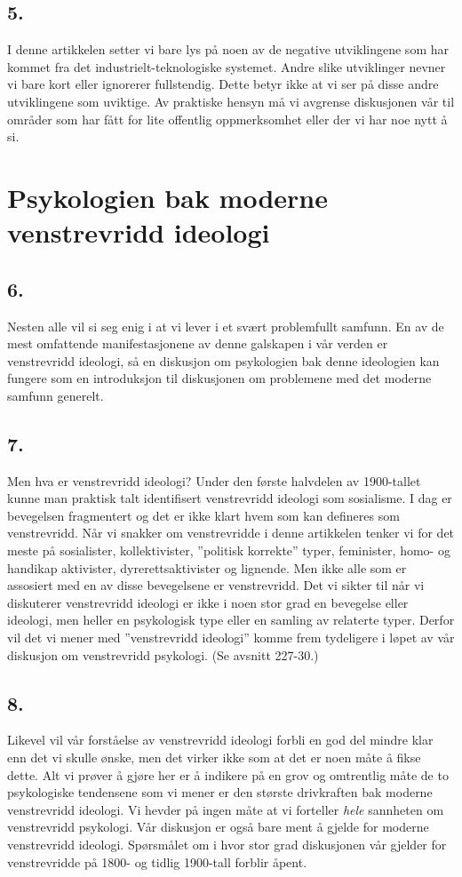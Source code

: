 \documentclass[oneside]{book}
\begin{document}
\section*{5.}
I denne artikkelen setter vi bare lys på noen av de negative utviklingene som har kommet fra det industrielt-teknologiske systemet. Andre slike utviklinger nevner vi bare kort eller ignorerer fullstendig. Dette betyr ikke at vi ser på disse andre utviklingene som uviktige. Av praktiske hensyn må vi avgrense diskusjonen vår til områder som har fått for lite offentlig oppmerksomhet eller der vi har noe nytt å si.

\chapter{Psykologien bak moderne venstrevridd ideologi}
\section*{6.}
Nesten alle vil si seg enig i at vi lever i et svært problemfullt samfunn. En av de mest omfattende manifestasjonene av denne galskapen i vår verden er venstrevridd ideologi, så en diskusjon om psykologien bak denne ideologien kan fungere som en introduksjon til diskusjonen om problemene med det moderne samfunn generelt.

\section*{7.}
Men hva er venstrevridd ideologi? Under den første halvdelen av 1900-tallet kunne man praktisk talt identifisert venstrevridd ideologi som sosialisme. I dag er bevegelsen fragmentert og det er ikke klart hvem som kan defineres som venstrevridd. Når vi snakker om venstrevridde i denne artikkelen tenker vi for det meste på sosialister, kollektivister, ''politisk korrekte'' typer, feminister, homo- og handikap aktivister, dyrerettsaktivister og lignende. Men ikke alle som er assosiert med en av disse bevegelsene er venstrevridd. Det vi sikter til når vi diskuterer venstrevridd ideologi er ikke i noen stor grad en bevegelse eller ideologi, men heller en psykologisk type eller en samling av relaterte typer. Derfor vil det vi mener med ''venstrevridd ideologi'' komme frem tydeligere i løpet av vår diskusjon om venstrevridd psykologi. (Se avsnitt 227-30.)

\section*{8.}
Likevel vil vår forståelse av venstrevridd ideologi forbli en god del mindre klar enn det vi skulle ønske, men det virker ikke som at det er noen måte å fikse dette. Alt vi prøver å gjøre her er å indikere på en grov og omtrentlig måte de to psykologiske tendensene som vi mener er den største drivkraften bak moderne venstrevridd ideologi. Vi hevder på ingen måte at vi forteller {\em hele} sannheten om venstrevridd psykologi. Vår diskusjon er også bare ment å gjelde for moderne venstrevridd ideologi. Spørsmålet om i hvor stor grad diskusjonen vår gjelder for venstrevridde på 1800- og tidlig 1900-tall forblir åpent.
\end{document}
